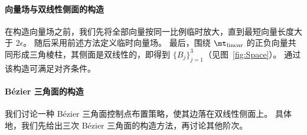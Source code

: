 \paragraph{向量场与双线性侧面的构造}
在构造向量场之前，我们先将全部向量按同一比例临时放大，直到最短向量长度大于 $2\epsilon$。
%
随后采用前述方法定义临时向量场。
%
最后，围绕 $\mt_{\text{linear}}$ 的正负向量共同形成三角棱柱，其侧面是双线性的，即得到 $\{B_{j}\}^3_{j=1}$（见图~\ref{fig:Space}）。
%
通过该构造可满足对齐条件。



\paragraph{B\'{e}zier 三角面的构造}
我们讨论一种 B\'{e}zier 三角面控制点布置策略，使其边落在双线性侧面上。
%
具体地，我们先给出三次 B\'{e}zier 三角面的构造方法，再讨论其他阶次。

